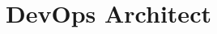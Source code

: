 \documentclass[11pt,a4paper,sans]{moderncv}        %
\title{DevOps Architect}                           %
\begin{document}
\makecvtitle


\end{document}
